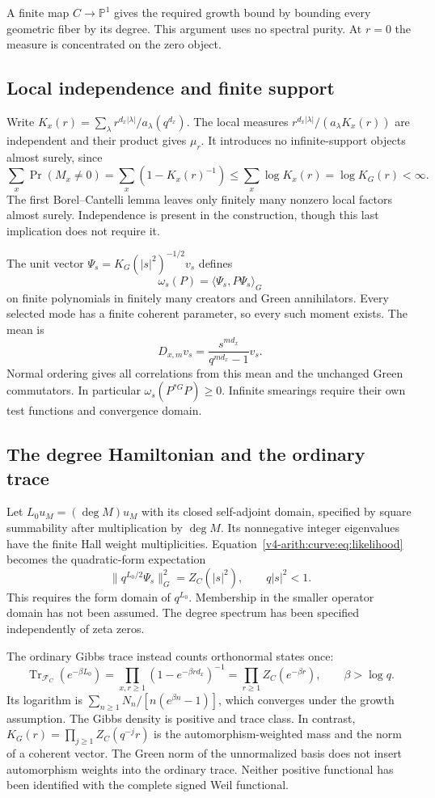 A finite map $C\to\mathbb P^1$ gives the required growth
bound by bounding every geometric fiber by its degree.
This argument uses no spectral purity. At $r=0$ the measure
is concentrated on the zero object.

\subsection{Local independence and finite support}

Write
$K_x(r)=\sum_\lambda r^{d_x|\lambda|}/a_\lambda(q^{d_x})$.
The local measures
$r^{d_x|\lambda|}/(a_\lambda K_x(r))$ are independent and
their product gives $\mu_r$. It introduces no infinite-support
objects almost surely, since
\[
 \sum_x\Pr(M_x\ne0)
 =\sum_x(1-K_x(r)^{-1})
 \leq\sum_x\log K_x(r)=\log K_G(r)<\infty .
\]
The first Borel--Cantelli lemma leaves only finitely many
nonzero local factors almost surely. Independence is present
in the construction, though this last implication does not
require it.

The unit vector $\Psi_s=K_G(|s|^2)^{-1/2}v_s$ defines
\[
 \omega_s(P)=\langle\Psi_s,P\Psi_s\rangle_G
\]
on finite polynomials in finitely many creators and Green
annihilators. Every selected mode has a finite coherent
parameter, so every such moment exists. The mean is
\[
 D_{x,m}v_s=\frac{s^{md_x}}{q^{md_x}-1}v_s.
\]
Normal ordering gives all correlations from this mean and
the unchanged Green commutators.
In particular $\omega_s(P^{*G}P)\geq0$.
Infinite smearings require their own test functions and
convergence domain.

\subsection{The degree Hamiltonian and the ordinary trace}

Let $L_0u_M=(\deg M)u_M$ with its closed self-adjoint domain,
specified by square summability after multiplication by
$\deg M$. Its nonnegative integer eigenvalues have the finite
Hall weight multiplicities. Equation~\eqref{v4-arith:curve:eq:likelihood}
becomes the quadratic-form expectation
\[
 \|q^{L_0/2}\Psi_s\|_G^2=Z_C(|s|^2),\qquad q|s|^2<1.
\]
This requires the form domain of $q^{L_0}$. Membership in
the smaller operator domain has not been assumed.
The degree spectrum has been specified independently of zeta zeros.

The ordinary Gibbs trace instead counts orthonormal states once:
\begin{equation}\label{v4-arith:curve:eq:gibbs}
 \operatorname{Tr}_{\mathcal F_C}(e^{-\beta L_0})
 =\prod_{x,r\geq1}(1-e^{-\beta rd_x})^{-1}
 =\prod_{r\geq1}Z_C(e^{-\beta r}),\qquad\beta>\log q .
\end{equation}
Its logarithm is
$\sum_{n\geq1}N_n/[n(e^{\beta n}-1)]$, which converges under
the growth assumption. The Gibbs density is positive and
trace class. In contrast, $K_G(r)=\prod_{j\geq1}Z_C(q^{-j}r)$
is the automorphism-weighted mass and the norm of a coherent
vector. The Green norm of the unnormalized basis does not
insert automorphism weights into the ordinary trace.
Neither positive functional has been identified with the
complete signed Weil functional.

